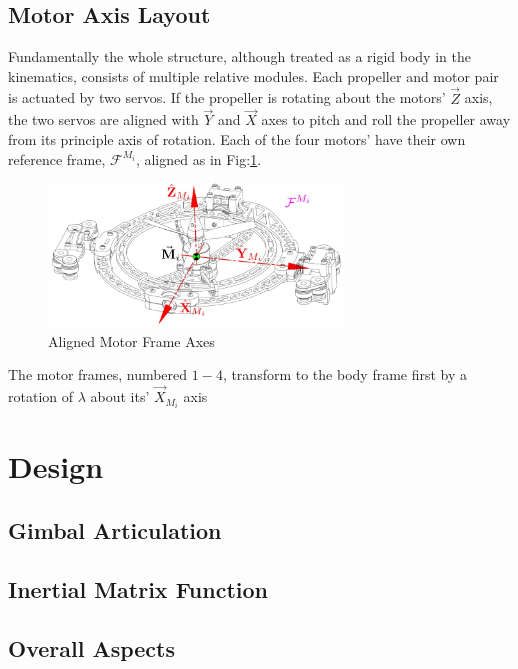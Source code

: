\subsection{Motor Axis Layout}
\label{subsec:proto.conventions.motoraxis}
Fundamentally the whole structure, although treated as a rigid body in the kinematics, consists of multiple relative modules. Each propeller and motor pair is actuated by two servos. If the propeller is rotating about the motors' $\vec{Z}$ axis, the two servos are aligned with $\vec{Y}$ and $\vec{X}$ axes to pitch and roll the propeller away from its principle axis of rotation. Each of the four motors' have their own reference frame, $\mathcal{F}^{M_i}$, aligned as in Fig:\ref{fig:motor-axes}.
\begin{figure}[htbp]\label{fig:motor-axes}
\centering
\includegraphics[width=0.7\textwidth]{figs/motor-axes}
\caption{Aligned Motor Frame Axes}
\end{figure}
The motor frames, numbered $1-4$, transform to the body frame first by a rotation of $\lambda$ about its' $\vec{X}_{M_i}$ axis 

\section{Design}
\label{sec:proto.design}
\subsection{Gimbal Articulation}
\label{subsec:proto.design.actuation}
\subsection{Inertial Matrix Function}
\label{subsec:proto.design.inertia}
\subsection{Overall Aspects}
\label{subsec:proto.design.aspects}
